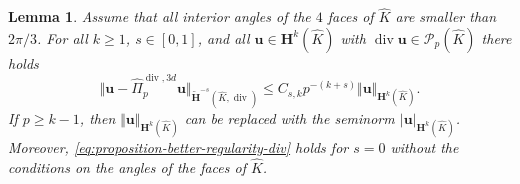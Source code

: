 \documentclass{article}
\newtheorem{lemma}[theorem]{Lemma}
\newcommand{\hatPidivcom}{\widehat\Pi^{\operatorname*{div},3d}_{p}}
\begin{document}
\begin{lemma}
\label{lemma:better-regularity-div}
Assume that all interior angles of the $4$ faces of $\widehat  K$ are smaller than $2\pi/3$.
For all $k\geq1$, $s \in [0,1]$, and all
${\mathbf{u}}\in{\mathbf{H}}^{k}(\widehat{K})$ with $\operatorname*{div}%
{\mathbf{u}}\in {\mathcal{P}}_{p}(\widehat{K})$ there holds
\begin{equation}
\Vert{\mathbf{u}}-\hatPidivcom{\mathbf{u}}%
\Vert_{\widetilde{\mathbf{H}}^{-s}(\widehat{K},\operatorname{div})}\leq C_{s,k}p^{-(k+s)}\Vert{\mathbf{u}}\Vert
_{\mathbf{H}^{k}(\widehat{K})}.
\label{eq:proposition-better-regularity-div}%
\end{equation}
If $p\geq k-1$, then $\Vert{\mathbf{u}}\Vert_{{\mathbf{H}}%
^{k}(\widehat{K})}$ can be replaced with the seminorm $|{\mathbf{u}%
}|_{{\mathbf{H}}^{k}(\widehat{K})}$.
Moreover, \eqref{eq:proposition-better-regularity-div} holds for  $s = 0$ without the conditions on the 
angles of the faces of $\widehat K$. 
\end{lemma}
\end{document}
